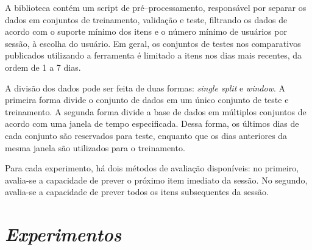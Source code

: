 A biblioteca contém um script de pré--processamento, responsável por separar os
dados em conjuntos de treinamento, validação e teste, filtrando os dados de
acordo com o suporte mínimo dos itens e o número mínimo de usuários por sessão,
à escolha do usuário. Em geral, os conjuntos de testes nos comparativos
publicados utilizando a ferramenta é limitado a itens nos dias mais recentes, da
ordem de 1 a 7 dias.

A divisão dos dados pode ser feita de duas formas: \textit{single split} e
\textit{window}. A primeira forma divide o conjunto de dados em um único
conjunto de teste e treinamento. A segunda forma divide a base de dados em
múltiplos conjuntos de acordo com uma janela de tempo especificada. Dessa forma, os
últimos dias de cada conjunto são reservados para teste, enquanto que os dias
anteriores da mesma janela são utilizados para o treinamento.

 Para cada experimento, há dois métodos de avaliação disponíveis: no primeiro,
 avalia-se a capacidade de prever o próximo item imediato da sessão. No segundo,
 avalia-se a capacidade de prever todos os itens subsequentes da sessão.

\section{\textit{Experimentos}} 




